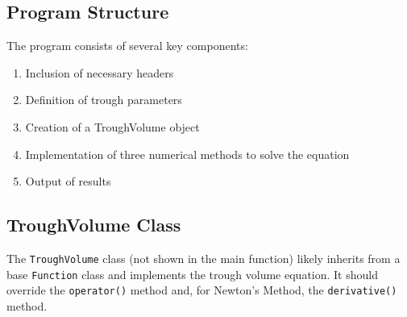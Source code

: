 \documentclass{article}
\begin{document}
\subsection{Program Structure}
The program consists of several key components:
\begin{enumerate}
\item Inclusion of necessary headers
\item Definition of trough parameters
\item Creation of a TroughVolume object
\item Implementation of three numerical methods to solve the equation
\item Output of results
\end{enumerate}

\subsection{TroughVolume Class}
The \texttt{TroughVolume} class (not shown in the main function) likely inherits from a base \texttt{Function} class and implements the trough volume equation. It should override the \texttt{operator()} method and, for Newton's Method, the \texttt{derivative()} method.
\end{document}
